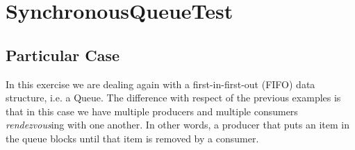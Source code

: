 \section{\textbf{SynchronousQueueTest}}
\subsection{Particular Case}
\par
In this exercise we are dealing again with a first-in-first-out (FIFO) data
structure, i.e. a Queue. The difference with respect of the previous examples is
that in this case we have multiple producers and multiple consumers
\textit{rendezvous}ing with one another. In other words, a producer that puts
an item in the queue blocks until that item is removed by a consumer.
\par
